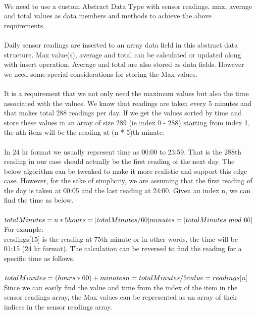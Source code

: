 \documentclass[12pt]{article}
\begin{document}
\paragraph{}We need to use a custom Abstract Data Type \cite{TEXTBOOK} with sensor readings, max, average and total values as data members and methods to achieve the above requirements.
\paragraph{}Daily sensor readings are inserted to an array data field in this abstract data structure. Max value(s), average and total can be calculated or updated along with insert operation. Average and total are also stored as data fields. However we need some special considerations for storing the Max values.
\paragraph{}It is a requirement that we not only need the maximum values but also the time associated with the values. We know that readings are taken every 5 minutes and that makes total 288 readings per day. If we get the values sorted by time and store these values in an array of size 289 (ie index 0 - 288) starting from index 1, the nth item will be the reading at (n * 5)th minute.
\paragraph{}In 24 hr format we usually represent time as 00:00 to 23:59. That is the 288th reading in our case should actually be the first reading of the next day. The below algorithm can be tweaked to make it more realistic and support this edge case. However, for the sake of simplicity, we are assuming that the first reading of the day is taken at 00:05 and the last reading at 24:00. Given an index n, we can find the time as below.\\ \\
\begin{math}
totalMinutes = n * 5 \\
hours = | totalMinutes / 60 | \\
minutes = | totalMinutes\ mod\ 60 | \\
\end{math}
\\
For example:\\
readings[15] is the reading at 75th minute or in other words, the time will be 01:15 (24 hr format). The calculation can be reversed to find the reading for a specific time as follows.\\ \\
\begin{math}
totalMinutes = (hours * 60) + minutes\\
n = totalMinutes / 5\\
value = readings[n]\\
\end{math}
\\
Since we can easily find the value and time from the index of the item in the sensor readings array, the Max values can be represented as an array of their indices in the sensor readings array.\\
\end{document}
